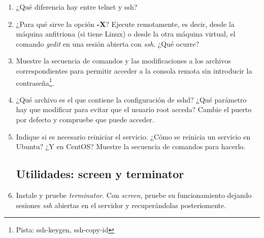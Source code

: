 \documentclass[paper=a4, fontsize=11pt]{scrartcl} %
\numberwithin{equation}{section} %
\numberwithin{figure}{section} %
\numberwithin{table}{section} %
\begin{document}
\begin{enumerate}
		De hecho, ambos servicios están colgados de forma abierta y permitiendo no sólo ver el código
		que utilizan si no también proponer cómo corregir un bug encontrado, reportarlo o simplemente
		crear nuestro propio gestor de paquetes basado en alguno de ellos\cite{oS_YaST_GitHub}
		\cite{oS_zypper_GitHub}.
		
		Ambos se distribuyen bajo la licencia \href{https://www.gnu.org/licenses/gpl.html}{\textbf{GPL}}
		\footnote{De hecho, creo que incluso utilizan la misma versión de dicha licencia.}.
	
	\section{Gestión de los cortafuegos(\textit{Firewalls})}
	\section{Instalación del servicio de acceso remoto a la consola(\textit{Secure Shell})}
		\item ¿Qué diferencia hay entre telnet y ssh?
		
		\item ¿Para qué sirve la opción \textbf{-X}? Ejecute remotamente, es decir, desde la máquina
		anfitriona (si tiene Linux) o desde la otra máquina virtual, el comando \textit{gedit} en una
		sesión abierta con \textit{ssh}. ¿Qué ocurre?
		
		\item Muestre la secuencia de comandos y las modificaciones a los archivos correspondientes
		para permitir acceder a la consola remota sin introducir la contraseña\footnote{Pista: ssh-keygen,
		ssh-copy-id}.
	
		\item ¿Qué archivo es el que contiene la configuración de sshd? ¿Qué parámetro hay que modificar
		para evitar que el usuario root acceda? Cambie el puerto por defecto y compruebe que puede
		acceder.
	
		\item Indique si es necesario reiniciar el servicio. ¿Cómo se reinicia un servicio en Ubuntu?
		¿Y en CentOS? Muestre la secuencia de comandos para hacerlo.
	
	\subsection{Utilidades: screen y terminator}
		\item Instale y pruebe \textit{terminator}. Con \textit{screen}, pruebe su funcionamiento
		dejando sesiones \textit{ssh} abiertas en el servidor y recuperándolas posteriomente.
	

\end{enumerate}
\end{document}
